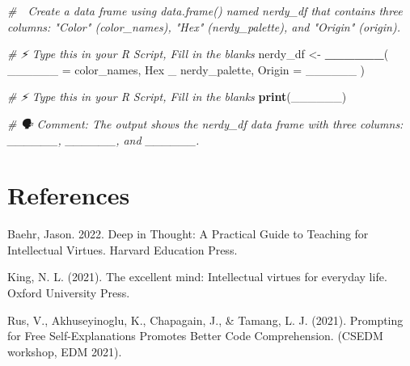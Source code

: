 \documentclass[
  12pt,
]{scrreprt}
\newenvironment{Shaded}{\begin{snugshade}}{\end{snugshade}}
\newcommand{\AttributeTok}[1]{\textcolor[rgb]{0.13,0.29,0.53}{#1}}
\newcommand{\CommentTok}[1]{\textcolor[rgb]{0.56,0.35,0.01}{\textit{#1}}}
\newcommand{\FunctionTok}[1]{\textcolor[rgb]{0.13,0.29,0.53}{\textbf{#1}}}
\newcommand{\NormalTok}[1]{#1}
\newcommand{\OtherTok}[1]{\textcolor[rgb]{0.56,0.35,0.01}{#1}}
\begin{document}
\begin{Shaded}
\begin{Highlighting}[]
\CommentTok{\# 🎯 Create a data frame using \textasciigrave{}data.frame()\textasciigrave{} named \textasciigrave{}nerdy\_df\textasciigrave{} that contains three columns: "Color" (\textasciigrave{}color\_names\textasciigrave{}), "Hex" (\textasciigrave{}nerdy\_palette\textasciigrave{}), and "Origin" (\textasciigrave{}origin\textasciigrave{}). }

\CommentTok{\# ⚡ Type this in your R Script, Fill in the blanks}
\NormalTok{nerdy\_df }\OtherTok{\textless{}{-}} \FunctionTok{\_\_\_\_\_\_}\NormalTok{(}
  \AttributeTok{\_\_\_\_\_\_ =}\NormalTok{ color\_names,}
\NormalTok{  Hex \_ nerdy\_palette,}
  \AttributeTok{Origin =}\NormalTok{ \_\_\_\_\_\_}
\NormalTok{)}

\CommentTok{\# ⚡ Type this in your R Script, Fill in the blanks}
\FunctionTok{print}\NormalTok{(\_\_\_\_\_\_)}


\CommentTok{\# 🗣 Comment: The output shows the \textasciigrave{}nerdy\_df\textasciigrave{} data frame with three columns: \_\_\_\_\_\_, \_\_\_\_\_\_, and \_\_\_\_\_\_. }
\end{Highlighting}
\end{Shaded}

\chapter{References}\label{references}

Baehr, Jason. 2022. Deep in Thought: A Practical Guide to Teaching for
Intellectual Virtues. Harvard Education Press.

King, N. L. (2021). The excellent mind: Intellectual virtues for
everyday life. Oxford University Press.

Rus, V., Akhuseyinoglu, K., Chapagain, J., \& Tamang, L. J. (2021).
Prompting for Free Self-Explanations Promotes Better Code Comprehension.
(CSEDM workshop, EDM 2021).


\end{document}
